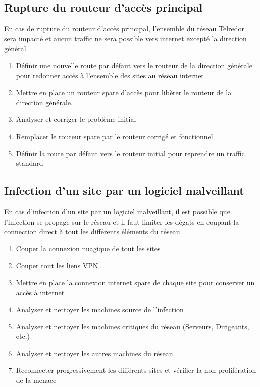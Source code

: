 \documentclass{article}
\newcommand{\tlr}{Telredor\xspace}
\begin{document}
\subsection{Rupture du routeur d'accès principal}

En cas de rupture du routeur d'accès principal, l'ensemble du réseau \tlr sera impacté et aucun traffic ne sera possible vers internet excepté la direction général.

\bigskip

\begin{enumerate}
  \item Définir une nouvelle route par défaut vers le routeur de la direction générale pour redonner accès à l'ensemble des sites au réseau internet
  \item Mettre en place un routeur spare d'accès pour libèrer le routeur de la direction générale.
  \item Analyser et corriger le problème initial
  \item Remplacer le routeur spare par le routeur corrigé et fonctionnel
  \item Définir la route par défaut vers le routeur initial pour reprendre un traffic standard
\end{enumerate}

\subsection{Infection d'un site par un logiciel malveillant}

En cas d'infection d'un site par un logiciel malveillant, il est possible que l'infection se propage sur le réseau et il faut limiter les dégats en coupant la connection direct à tout les différents éléments du réseau.

\bigskip

\begin{enumerate}
  \item Couper la connexion nuagique de tout les sites
  \item Couper tout les liens VPN
  \item Mettre en place la connexion internet spare de chaque site pour conserver un accès à internet
  \item Analyser et nettoyer les machines source de l'infection
  \item Analyser et nettoyer les machines critiques du réseau (Serveurs, Dirigeants, etc.)
  \item Analyser et nettoyer les autres machines du réseau
  \item Reconnecter progressivement les différents sites et vérifier la non-prolifération de la menace
\end{enumerate}
\end{document}
